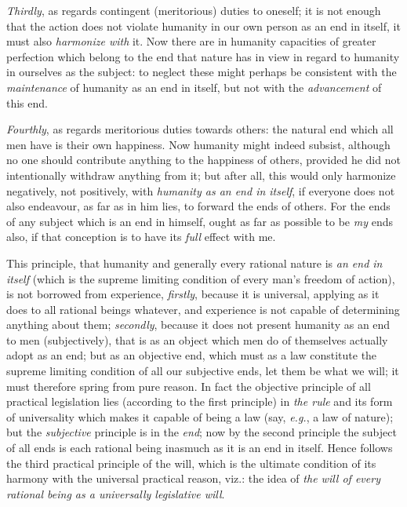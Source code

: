 \textit{Thirdly}, as regards contingent (meritorious) duties to
oneself; it is not enough that the action does not violate humanity in
our own person as an end in itself, it must also \textit{harmonize
with} it. Now there are in humanity capacities of greater perfection
which belong to the end that nature has in view in regard to humanity
in ourselves as the subject: to neglect these might perhaps be
consistent with the \textit{maintenance} of humanity as an end in
itself, but not with the \textit{advancement} of this end.

\textit{Fourthly}, as regards meritorious duties towards others: the
natural end which all men have is their own happiness. Now humanity
might indeed subsist, although no one should contribute anything to
the happiness of others, provided he did not intentionally withdraw
anything from it; but after all, this would only harmonize negatively,
not positively, with \textit{humanity  as an end in itself},
if everyone does not also endeavour, as far as in him lies, to forward
the ends of others. For the ends of any subject which is an end in
himself, ought as far as possible to be \textit{my} ends also, if that
conception is to have its \textit{full} effect with me.

This principle, that humanity and generally every rational nature is
\textit{an end in itself} (which is the supreme limiting condition of
every man's freedom of action), is not borrowed from experience,
\textit{firstly}, because it is universal, applying as it does to all
rational beings whatever, and experience is not capable of determining
anything about them; \textit{secondly}, because it does not present
humanity as an end to men (subjectively), that is as an object which
men do of themselves actually adopt as an end; but as an objective
end, which must as a law constitute the supreme limiting condition of
all our subjective ends, let them be what we will; it must therefore
spring from pure reason. In fact the objective principle of all
practical legislation lies (according to the first principle) in
\textit{the rule} and its form of universality which makes it capable
of being a law (say, \textit{e.g.}, a law of nature); but the
\textit{subjective} principle is in the \textit{end}; now by the
second principle the subject of all ends is each rational being
inasmuch as it is an end in itself. Hence follows the third practical
principle of the will, which is the ultimate condition of its harmony
with the universal practical reason, viz.: the idea of \textit{the
will of every rational being as a universally legislative will}.

